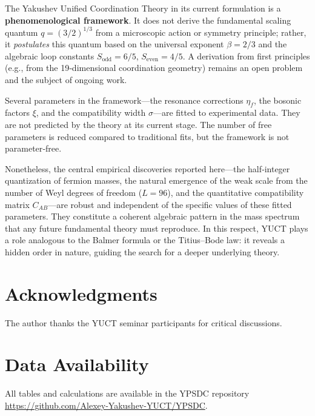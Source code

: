 \documentclass[11pt,a4paper]{article}
\begin{document}
	The Yakushev Unified Coordination Theory in its current formulation is a \textbf{phenomenological framework}. It does not derive the fundamental scaling quantum \(q = (3/2)^{1/3}\) from a microscopic action or symmetry principle; rather, it \emph{postulates} this quantum based on the universal exponent \(\beta = 2/3\) and the algebraic loop constants \(S_{\mathrm{odd}}=6/5\), \(S_{\mathrm{even}}=4/5\). A derivation from first principles (e.g., from the 19‑dimensional coordination geometry) remains an open problem and the subject of ongoing work.
	
	Several parameters in the framework—the resonance corrections \(\eta_f\), the bosonic factors \(\xi\), and the compatibility width \(\sigma\)—are fitted to experimental data. They are not predicted by the theory at its current stage. The number of free parameters is reduced compared to traditional fits, but the framework is not parameter‑free.
	
	Nonetheless, the central empirical discoveries reported here—the half‑integer quantization of fermion masses, the natural emergence of the weak scale from the number of Weyl degrees of freedom (\(L=96\)), and the quantitative compatibility matrix \(C_{AB}\)—are robust and independent of the specific values of these fitted parameters. They constitute a coherent algebraic pattern in the mass spectrum that any future fundamental theory must reproduce. In this respect, YUCT plays a role analogous to the Balmer formula or the Titius–Bode law: it reveals a hidden order in nature, guiding the search for a deeper underlying theory.
	
	\section*{Acknowledgments}
	The author thanks the YUCT seminar participants for critical discussions.
	
	\section*{Data Availability}
	All tables and calculations are available in the YPSDC repository \url{https://github.com/Alexey-Yakushev-YUCT/YPSDC}.
	
\end{document}
